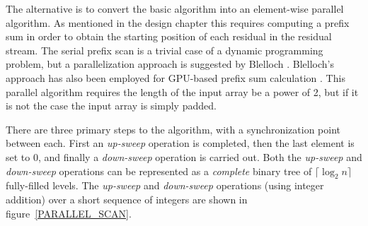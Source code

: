   The alternative is to convert the basic algorithm into an element-wise parallel algorithm. As mentioned in the design chapter this requires computing a prefix sum  
  in order to obtain the starting position of each residual in the residual stream. The serial prefix scan is a trivial case of a dynamic programming problem, but a
  parallelization approach is suggested by Blelloch \cite{blelloch1990prefix}. Blelloch's approach has also been employed for GPU-based prefix sum calculation \cite{harris2007parallel}. 
  This parallel algorithm requires the length of the input array be a power of 2, but if it is not the case the input array is simply padded. 
  
  There are three primary steps to the algorithm, with a synchronization point between each. First an \textit{up-sweep} operation is completed, then the last element is set to 0, 
  and finally a \textit{down-sweep} operation is carried out. Both the \textit{up-sweep} and \textit{down-sweep} operations can be represented as a \textit{complete} binary tree 
  of $\lceil\log_2n\rceil$ fully-filled levels. The \textit{up-sweep} and \textit{down-sweep} operations (using integer addition) over a short sequence of integers are shown in 
  figure~\ref{PARALLEL_SCAN}. 
  
